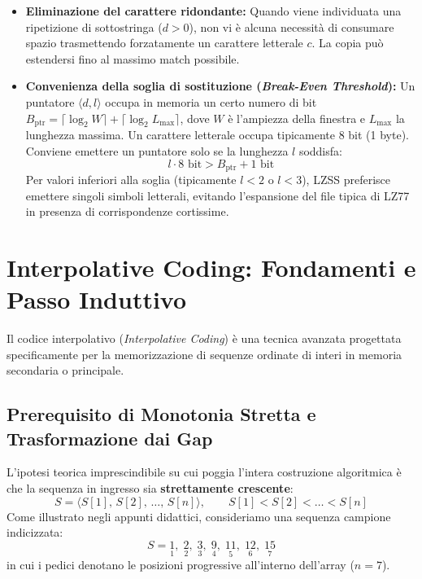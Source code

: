 \begin{property}
\begin{itemize}
  \item \textbf{Eliminazione del carattere ridondante:} Quando viene individuata una ripetizione di sottostringa ($d > 0$), non vi \`e alcuna necessit\`a di consumare spazio trasmettendo forzatamente un carattere letterale $c$. La copia pu\`o estendersi fino al massimo match possibile.
  \item \textbf{Convenienza della soglia di sostituzione (\textit{Break-Even Threshold}):} Un puntatore $\langle d, l \rangle$ occupa in memoria un certo numero di bit $B_{\text{ptr}} = \lceil \log_2 W \rceil + \lceil \log_2 L_{\max} \rceil$, dove $W$ \`e l'ampiezza della finestra e $L_{\max}$ la lunghezza massima. Un carattere letterale occupa tipicamente 8 bit (1 byte). Conviene emettere un puntatore solo se la lunghezza $l$ soddisfa:
  \begin{equation}
    l \cdot 8 \text{ bit} > B_{\text{ptr}} + 1 \text{ bit}
  \end{equation}
  Per valori inferiori alla soglia (tipicamente $l < 2$ o $l < 3$), LZSS preferisce emettere singoli simboli letterali, evitando l'espansione del file tipica di LZ77 in presenza di corrispondenze cortissime.
\end{itemize}
\end{property}

\FloatBarrier
\section{Interpolative Coding: Fondamenti e Passo Induttivo}
\label{sec:interpolative-coding-fondamenti}

Il codice interpolativo (\textit{Interpolative Coding}) \cite{moffat2000interpolative} \`e una tecnica avanzata progettata specificamente per la memorizzazione di sequenze ordinate di interi in memoria secondaria o principale.

\FloatBarrier
\subsection{Prerequisito di Monotonia Stretta e Trasformazione dai Gap}
\label{subsec:monotonia-trasformazione-gap}

L'ipotesi teorica imprescindibile su cui poggia l'intera costruzione algoritmica \`e che la sequenza in ingresso sia \textbf{strettamente crescente}:
\begin{equation}
  S = \langle S[1], \, S[2], \, \dots, \, S[n] \rangle, \qquad S[1] < S[2] < \dots < S[n]
\end{equation}
Come illustrato negli appunti didattici, consideriamo una sequenza campione indicizzata:
\begin{equation}
  S = \underset{1}{1}, \; \underset{2}{2}, \; \underset{3}{3}, \; \underset{4}{9}, \; \underset{5}{11}, \; \underset{6}{12}, \; \underset{7}{15}
\end{equation}
in cui i pedici denotano le posizioni progressive all'interno dell'array ($n = 7$).

